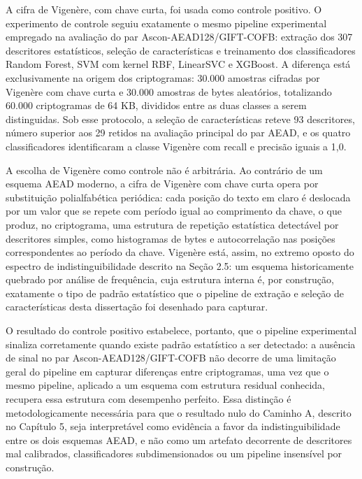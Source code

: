A cifra de Vigenère, com chave curta, foi usada como controle positivo. O experimento de controle seguiu exatamente o mesmo pipeline experimental empregado na avaliação do par Ascon-AEAD128/GIFT-COFB: extração dos 307 descritores estatísticos, seleção de características e treinamento dos classificadores Random Forest, SVM com kernel RBF, LinearSVC e XGBoost. A diferença está exclusivamente na origem dos criptogramas: 30.000 amostras cifradas por Vigenère com chave curta e 30.000 amostras de bytes aleatórios, totalizando 60.000 criptogramas de 64 KB, divididos entre as duas classes a serem distinguidas. Sob esse protocolo, a seleção de características reteve 93 descritores, número superior aos 29 retidos na avaliação principal do par AEAD, e os quatro classificadores identificaram a classe Vigenère com recall e precisão iguais a 1,0.

A escolha de Vigenère como controle não é arbitrária. Ao contrário de um esquema AEAD moderno, a cifra de Vigenère com chave curta opera por substituição polialfabética periódica: cada posição do texto em claro é deslocada por um valor que se repete com período igual ao comprimento da chave, o que produz, no criptograma, uma estrutura de repetição estatística detectável por descritores simples, como histogramas de bytes e autocorrelação nas posições correspondentes ao período da chave. Vigenère está, assim, no extremo oposto do espectro de indistinguibilidade descrito na Seção 2.5: um esquema historicamente quebrado por análise de frequência, cuja estrutura interna é, por construção, exatamente o tipo de padrão estatístico que o pipeline de extração e seleção de características desta dissertação foi desenhado para capturar.

O resultado do controle positivo estabelece, portanto, que o pipeline experimental sinaliza corretamente quando existe padrão estatístico a ser detectado: a ausência de sinal no par Ascon-AEAD128/GIFT-COFB não decorre de uma limitação geral do pipeline em capturar diferenças entre criptogramas, uma vez que o mesmo pipeline, aplicado a um esquema com estrutura residual conhecida, recupera essa estrutura com desempenho perfeito. Essa distinção é metodologicamente necessária para que o resultado nulo do Caminho A, descrito no Capítulo 5, seja interpretável como evidência a favor da indistinguibilidade entre os dois esquemas AEAD, e não como um artefato decorrente de descritores mal calibrados, classificadores subdimensionados ou um pipeline insensível por construção.

